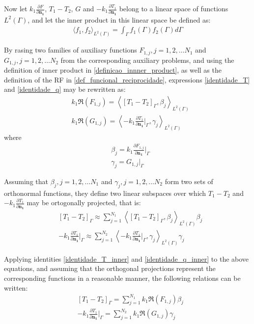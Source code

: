 \documentclass[conference,compsoc,fleqn]{IEEEtran}
\begin{document}
Now let $k_1 \frac{\partial F}{\partial\mathbf{n_1}}$, $T_1 - T_2$, $G$ and $-k_1 \frac{\partial T_1}{\partial\mathbf{n_1}}$ belong to a linear space of functions $L^2(\Gamma)$, and let the inner product in this linear space be defined as:
\begin{align}
	\langle f_1, f_2\rangle_{L^2(\Gamma)} = \int_\Gamma f_1(\Gamma) f_2(\Gamma) d\Gamma \label{definicao_innner_product}
\end{align} 

By rasing two families of auxiliary functions $F_{1,j}, j=1,2,\ldots N_1$ and $G_{1,j}, j=1,2,\ldots N_2$ from the corresponding auxiliary problems, and using the definition of inner product in \eqref{definicao_innner_product}, as well as the definition of the RF in \eqref{def_funcional_reciprocidade}, expressions \eqref{identidade_T} and \eqref{identidade_q} may be rewritten as:
\begin{align}
	& k_1 \Re(F_{1,j})
	=
	\left\langle \left[T_1 - T_2\right]_\Gamma, \beta_j\right\rangle _{L^2(\Gamma)}
	\label{identidade_T_inner} \\
	& k_1 \Re(G_{1,j})
	=
	\left\langle  -k_1 \frac{\partial T_1}{\partial\mathbf{n_1}}\bigg|_\Gamma, \gamma_j\right\rangle _{L^2(\Gamma)}
	\label{identidade_q_inner}
\end{align}
where
\begin{align}
	& \beta_j = k_1 \frac{\partial F_{1,j}}{\partial\mathbf{n_1}}\bigg|_\Gamma \label{expressao_define_beta} \\
	& \gamma_j = G_{1,j}\big|_\Gamma \label{expressao_define_gamma}
\end{align}

Assuming that $\beta_j, j=1,2,\ldots N_1$ and $\gamma_j, j=1,2,\ldots N_2$ form two sets of orthonormal functions, they define two linear subspaces over which $T_1 - T_2$ and $-k_1 \frac{\partial T_1}{\partial\mathbf{n_1}}$ may be ortogonally projected, that is:
\begin{align}
	& [T_1 - T_2]_\Gamma \approx \sum_{j=1}^{N_1} \left\langle  \left[T_1 - T_2\right]_\Gamma, \beta_j \right\rangle_{L^2(\Gamma)} \beta_j \\ 
	& - k_1 \frac{\partial T_1}{\partial\mathbf{n_1}}\bigg|_\Gamma \approx \sum_{j=1}^{N_2} \left\langle  -k_1 \frac{\partial T_1}{\partial\mathbf{n_1}}\bigg|_\Gamma, \gamma_j \right\rangle_{L^2(\Gamma)} \gamma_j
\end{align}

Applying identities \eqref{identidade_T_inner} and \eqref{identidade_q_inner} to the above equations, and assuming that the orthogonal projections represent the corresponding functions in a reasonable manner, the following relations can be written:
\begin{align}
	& [T_1 - T_2]_\Gamma = \sum_{j=1}^{N_1} k_1 \Re(F_{1,j}) \beta_j \label{resultado_1} \\
	& - k_1 \frac{\partial T_1}{\partial\mathbf{n_1}}\bigg|_\Gamma = \sum_{j=1}^{N_2} k_1 \Re(G_{1,j}) \gamma_j \label{resultado_2}
\end{align}
\end{document}
